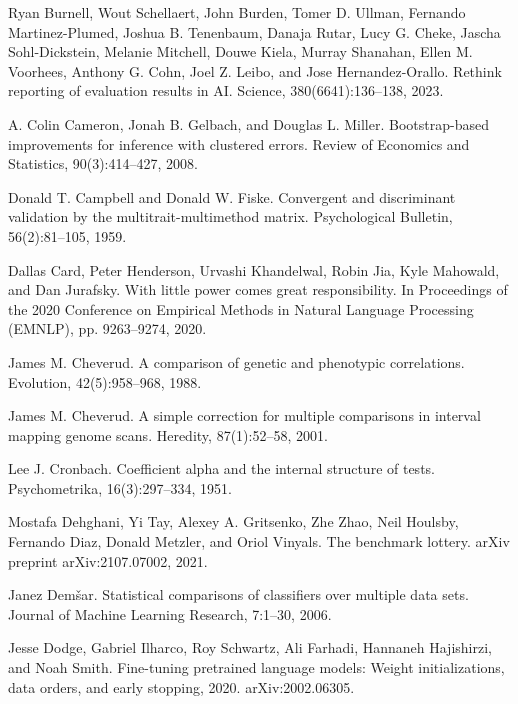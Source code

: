 \noindent Ryan Burnell, Wout Schellaert, John Burden, Tomer D. Ullman, Fernando Martinez-Plumed, Joshua B. Tenenbaum, Danaja Rutar, Lucy G. Cheke, Jascha Sohl-Dickstein, Melanie Mitchell, Douwe Kiela, Murray Shanahan, Ellen M. Voorhees, Anthony G. Cohn, Joel Z. Leibo, and Jose Hernandez-Orallo. Rethink reporting of evaluation results in AI. Science, 380(6641):136--138, 2023.\par\medskip

\noindent A. Colin Cameron, Jonah B. Gelbach, and Douglas L. Miller. Bootstrap-based improvements for inference with clustered errors. Review of Economics and Statistics, 90(3):414--427, 2008.\par\medskip

\noindent Donald T. Campbell and Donald W. Fiske. Convergent and discriminant validation by the multitrait-multimethod matrix. Psychological Bulletin, 56(2):81--105, 1959.\par\medskip

\noindent Dallas Card, Peter Henderson, Urvashi Khandelwal, Robin Jia, Kyle Mahowald, and Dan Jurafsky. With little power comes great responsibility. In Proceedings of the 2020 Conference on Empirical Methods in Natural Language Processing (EMNLP), pp. 9263--9274, 2020.\par\medskip

\noindent James M. Cheverud. A comparison of genetic and phenotypic correlations. Evolution, 42(5):958--968, 1988.\par\medskip

\noindent James M. Cheverud. A simple correction for multiple comparisons in interval mapping genome scans. Heredity, 87(1):52--58, 2001.\par\medskip

\noindent Lee J. Cronbach. Coefficient alpha and the internal structure of tests. Psychometrika, 16(3):297--334, 1951.\par\medskip

\noindent Mostafa Dehghani, Yi Tay, Alexey A. Gritsenko, Zhe Zhao, Neil Houlsby, Fernando Diaz, Donald Metzler, and Oriol Vinyals. The benchmark lottery. arXiv preprint arXiv:2107.07002, 2021.\par\medskip

\noindent Janez Dem\v{s}ar. Statistical comparisons of classifiers over multiple data sets. Journal of Machine Learning Research, 7:1--30, 2006.\par\medskip

\noindent Jesse Dodge, Gabriel Ilharco, Roy Schwartz, Ali Farhadi, Hannaneh Hajishirzi, and Noah Smith. Fine-tuning pretrained language models: Weight initializations, data orders, and early stopping, 2020. arXiv:2002.06305.\par\medskip

